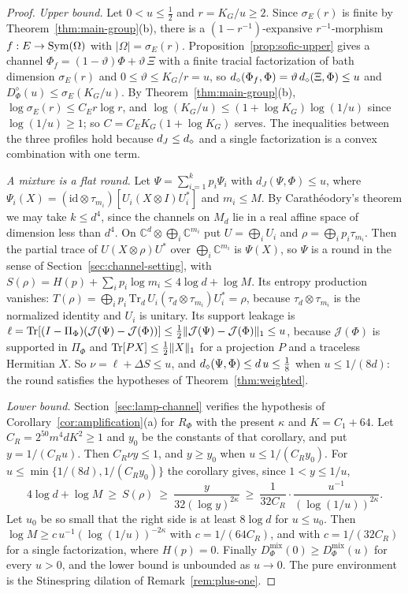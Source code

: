 \begin{proof}
\emph{Upper bound.} Let $0<u\le\frac12$ and $r=K_G/u\ge2$. Since $\sigma_E(r)$ is finite by Theorem~\ref{thm:main-group}(b), there is a
$(1-r^{-1})$-expansive $r^{-1}$-morphism $f:E\to\operatorname{Sym}(\Omega)$ with $|\Omega|=\sigma_E(r)$. Proposition~\ref{prop:sofic-upper} gives a channel
$\Phi_f=(1-\vartheta)\Phi+\vartheta\,\Xi$ with a finite tracial factorization of bath dimension $\sigma_E(r)$ and $0\le\vartheta\le K_G/r=u$, so
$d_\diamond(\Phi_f,\Phi)=\vartheta\,d_\diamond(\Xi,\Phi)\le u$ and $D^\diamond_\Phi(u)\le\sigma_E(K_G/u)$. By Theorem~\ref{thm:main-group}(b),
$\log\sigma_E(r)\le C_Er\log r$, and $\log(K_G/u)\le(1+\log K_G)\log(1/u)$ since $\log(1/u)\ge1$; so $C=C_EK_G(1+\log K_G)$ serves. The
inequalities between the three profiles hold because $d_J\le d_\diamond$ and a single factorization is a convex combination with one term.

\emph{A mixture is a flat round.} Let $\Psi=\sum_{i=1}^kp_i\Psi_i$ with $d_J(\Psi,\Phi)\le u$, where
$\Psi_i(X)=(\mathrm{id}\otimes\tau_{m_i})[U_i(X\otimes I)U_i^*]$ and $m_i\le M$. By Carath\'eodory's theorem we may take $k\le d^4$, since
the channels on $M_d$ lie in a real affine space of dimension less than $d^4$. On $\mathbb C^d\otimes\bigoplus_i\mathbb C^{m_i}$ put
$U=\bigoplus_iU_i$ and $\rho=\bigoplus_ip_i\tau_{m_i}$. Then the partial trace of $U(X\otimes\rho)U^*$ over $\bigoplus_i\mathbb C^{m_i}$ is
$\Psi(X)$, so $\Psi$ is a round in the sense of Section~\ref{sec:channel-setting}, with $S(\rho)=H(p)+\sum_ip_i\log m_i\le4\log d+\log M$. Its
entropy production vanishes: $T(\rho)=\bigoplus_ip_i\,\mathrm{Tr}_d\,U_i(\tau_d\otimes\tau_{m_i})U_i^*=\rho$, because
$\tau_d\otimes\tau_{m_i}$ is the normalized identity and $U_i$ is unitary. Its support leakage is
$\ell=\operatorname{Tr}[(I-\Pi_\Phi)(\mathcal J(\Psi)-\mathcal J(\Phi))]\le\frac12\|\mathcal J(\Psi)-\mathcal J(\Phi)\|_1\le u$, because $\mathcal J(\Phi)$
is supported in $\Pi_\Phi$ and $\operatorname{Tr}[PX]\le\frac12\|X\|_1$ for a projection $P$ and a traceless Hermitian $X$. So $\nu=\ell+\Delta S\le u$, and
$d_\diamond(\Psi,\Phi)\le d\,u\le\frac18$ when $u\le1/(8d)$: the round satisfies the hypotheses of Theorem~\ref{thm:weighted}.

\emph{Lower bound.} Section~\ref{sec:lamp-channel} verifies the hypothesis of Corollary~\ref{cor:amplification}(a) for $R_\Phi$ with the
present $\kappa$ and $K=C_1+64$. Let $C_R=2^{50}m^4dK^2\ge1$ and $y_0$ be the constants of that corollary, and put $y=1/(C_Ru)$. Then
$C_R\nu y\le1$, and $y\ge y_0$ when $u\le1/(C_Ry_0)$. For $u\le\min\{1/(8d),1/(C_Ry_0)\}$ the corollary gives, since $1<y\le1/u$,
\[
4\log d+\log M\ \ge\ S(\rho)\ \ge\ \frac{y}{32(\log y)^{2\kappa}}\ \ge\ \frac1{32C_R}\cdot\frac{u^{-1}}{(\log(1/u))^{2\kappa}} .
\]
Let $u_0$ be so small that the right side is at least $8\log d$ for $u\le u_0$. Then $\log M\ge c\,u^{-1}(\log(1/u))^{-2\kappa}$ with
$c=1/(64C_R)$, and with $c=1/(32C_R)$ for a single factorization, where $H(p)=0$. Finally $D^{\mathrm{mix}}_\Phi(0)\ge D^{\mathrm{mix}}_\Phi(u)$
for every $u>0$, and the lower bound is unbounded as $u\to0$. The pure environment is the Stinespring dilation of Remark~\ref{rem:plus-one}.
\end{proof}

